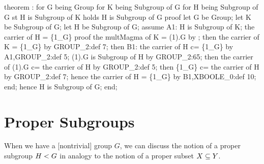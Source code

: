 \nwenddocs{}\endmoddef\nwstartdeflinemarkup{}\nwenddeflinemarkup
theorem :
  for G being Group
  for K being  Subgroup of G
  for H being Subgroup of G
  st H is Subgroup of K
  holds H is  Subgroup of G
proof
  let G be Group;
  let K be  Subgroup of G;
  let H be Subgroup of G;
  assume A1: H is Subgroup of K;
  the carrier of H = \{1_G\}
  proof
    the multMagma of K = (1).G by ;
    then the carrier of K = \{1_G\} by GROUP_2:def 7;
    then B1: the carrier of H c= \{1_G\} by A1,GROUP_2:def 5;
    (1).G is Subgroup of H by GROUP_2:65;
    then the carrier of (1).G c= the carrier of H by GROUP_2:def 5;
    then \{1_G\} c= the carrier of H by GROUP_2:def 7;
    hence the carrier of H = \{1_G\} by B1,XBOOLE_0:def 10;
  end;
  hence H is  Subgroup of G;
end;
\eatline
{}\nwendcode{}\nwdocspar
\section{Proper Subgroups}
When we have a [nontrivial] group $G$, we can discuss the notion of a
proper subgroup $H< G$ in analogy to the notion of a
proper subset $X\properSubset Y$.


